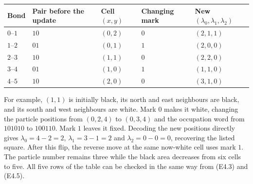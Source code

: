 \documentclass[
  11pt,
  a4paper,
]{article}
\begin{document}
\begin{longtable}[]{@{}
  >{\raggedright\arraybackslash}p{}
  >{\raggedright\arraybackslash}p{}
  >{\raggedright\arraybackslash}p{}
  >{\raggedright\arraybackslash}p{}
  >{\raggedright\arraybackslash}p{}@{}}
\toprule\noalign{}
\begin{minipage}[b]{\linewidth}\raggedright
Bond
\end{minipage} & \begin{minipage}[b]{\linewidth}\raggedright
Pair before the update
\end{minipage} & \begin{minipage}[b]{\linewidth}\raggedright
Cell \((x,y)\)
\end{minipage} & \begin{minipage}[b]{\linewidth}\raggedright
Changing mark
\end{minipage} & \begin{minipage}[b]{\linewidth}\raggedright
New \((\lambda_0,\lambda_1,\lambda_2)\)
\end{minipage} \\
\midrule\noalign{}
\endhead
\bottomrule\noalign{}
\endlastfoot
\(0\)--\(1\) & \(10\) & \((0,2)\) & \(0\) & \((2,1,1)\) \\
\(1\)--\(2\) & \(01\) & \((0,1)\) & \(1\) & \((2,0,0)\) \\
\(2\)--\(3\) & \(10\) & \((1,1)\) & \(0\) & \((2,2,0)\) \\
\(3\)--\(4\) & \(01\) & \((1,0)\) & \(1\) & \((1,1,0)\) \\
\(4\)--\(5\) & \(10\) & \((2,0)\) & \(0\) & \((3,1,0)\) \\
\end{longtable}

For example, \((1,1)\) is initially black, its north and east neighbours
are black, and its south and west neighbours are white. Mark \(0\) makes
it white, changing the particle positions from \((0,2,4)\) to
\((0,3,4)\) and the occupation word from \(101010\) to \(100110\). Mark
\(1\) leaves it fixed. Decoding the new positions directly gives
\(\lambda_0=4-2=2\), \(\lambda_1=3-1=2\) and \(\lambda_2=0-0=0\),
recovering the listed square. After this flip, the reverse move at the
same now-white cell uses mark \(1\). The particle number remains three
while the black area decreases from six cells to five. All five rows of
the table can be checked in the same way from (E4.3) and (E4.5).
\end{document}
